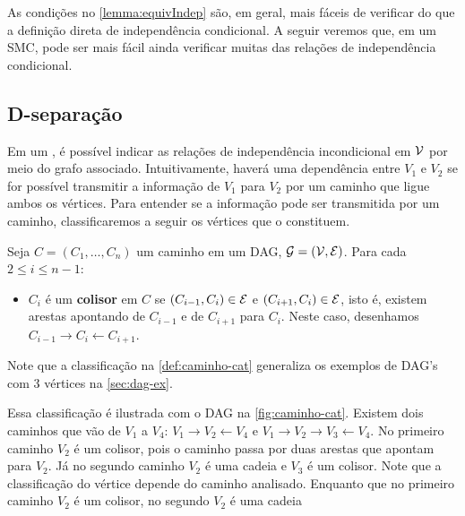 As condições no \cref{lemma:equivIndep} são, em geral,
mais fáceis de verificar do que 
a definição direta de independência condicional.
A seguir veremos que, em um SMC, pode
ser mais fácil ainda verificar
muitas das relações de independência condicional.

\subsection{D-separação}

Em um \CM, é possível indicar 
as relações de independência incondicional em ${\mathcal V}$
por meio do grafo associado.
Intuitivamente, haverá uma dependência
entre $V_1$ e $V_2$ se for possível
transmitir a informação de $V_1$ para $V_2$
por um caminho que ligue ambos os vértices.
Para entender se a informação 
pode ser transmitida por um caminho,
classificaremos a seguir os vértices que o constituem.

\begin{definition}
 \label{def:caminho-cat}
 Seja $C = (C_1,\ldots,C_n)$ um caminho 
 em um DAG, ${\mathcal G} = ({\mathcal V},{\mathcal E})$.
 Para cada $2 \leq i \leq n-1$:
 \begin{itemize}
  \item $C_i$ é um \textbf{colisor} em $C$ se
  $(C_{i-1},C_{i}) \in {\mathcal E}$ e $(C_{i+1},C_{i}) \in {\mathcal E}$,
  isto é, existem arestas apontando de $C_{i-1}$ e de $C_{i+1}$ 
  para $C_{i}$. Neste caso, desenhamos
  $C_{i-1} \rightarrow C_i \leftarrow C_{i+1}$.
 \end{itemize}
\end{definition}

Note que a classificação na \cref{def:caminho-cat}
generaliza os exemplos de DAG's com 3 vértices 
na \cref{sec:dag-ex}. 

Essa classificação é ilustrada com 
o DAG na \cref{fig:caminho-cat}.
Existem dois caminhos que vão de $V_1$ a $V_4$:
$V_1 \rightarrow V_2 \leftarrow V_4$ e
$V_1 \rightarrow V_2 \rightarrow V_3 \leftarrow V_4$.
No primeiro caminho $V_2$ é um colisor, pois
o caminho passa por duas arestas que apontam para $V_2$.
Já no segundo caminho $V_2$ é uma cadeia e
$V_3$ é um colisor.
Note que a classificação do vértice depende 
do caminho analisado.
Enquanto que no primeiro caminho $V_2$ é um colisor,
no segundo $V_2$ é uma cadeia

